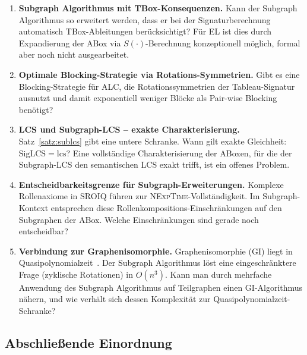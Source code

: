 ﻿\documentclass[a4paper,12pt]{article}
\theoremstyle{definition}
\theoremstyle{plain}
\theoremstyle{remark}
\begin{document}
\begin{enumerate}
  \item \textbf{Subgraph Algorithmus mit TBox-Konsequenzen.}
        Kann der Subgraph Algorithmus so erweitert werden,
        dass er bei der Signaturberechnung automatisch
        TBox-Ableitungen ber{\"u}cksichtigt?
        F{\"u}r \textsf{EL} ist dies durch Expandierung der ABox via
        $S(\cdot)$-Berechnung konzeptionell m{\"o}glich,
        formal aber noch nicht ausgearbeitet.

  \item \textbf{Optimale Blocking-Strategie via Rotations-Symmetrien.}
        Gibt es eine Blocking-Strategie f{\"u}r \textsf{ALC},
        die Rotationssymmetrien der Tableau-Signatur ausnutzt
        und damit exponentiell weniger Bl{\"o}cke als Pair-wise Blocking ben{\"o}tigt?

  \item \textbf{LCS und Subgraph-LCS -- exakte Charakterisierung.}
        Satz~\ref{satz:sublcs} gibt eine untere Schranke.
        Wann gilt exakte Gleichheit: $\mathrm{SigLCS} = \mathrm{lcs}$?
        Eine vollst{\"a}ndige Charakterisierung der ABoxen, f{\"u}r die
        der Subgraph-LCS den semantischen LCS exakt trifft,
        ist ein offenes Problem.

  \item \textbf{Entscheidbarkeitsgrenze f{\"u}r Subgraph-Erweiterungen.}
        Komplexe Rollenaxiome in \textsf{SROIQ} f{\"u}hren zur
        \textsc{NExpTime}-Vollst{\"a}ndigkeit. Im Subgraph-Kontext
        entsprechen diese Rollenkompositions-Einschr{\"a}nkungen auf
        den Subgraphen der ABox. Welche Einschr{\"a}nkungen sind
        gerade noch entscheidbar?

  \item \textbf{Verbindung zur Graphenisomorphie.}
        Graphenisomorphie (GI) liegt in Quasipolynomialzeit~\cite{Babai2016}.
        Der Subgraph Algorithmus l{\"o}st eine eingeschr{\"a}nktere Frage
        (zyklische Rotationen) in $O(n^3)$.
        Kann man durch mehrfache Anwendung des Subgraph Algorithmus
        auf Teilgraphen einen GI-Algorithmus n{\"a}hern,
        und wie verh{\"a}lt sich dessen Komplexit{\"a}t zur Quasi\-polynomialzeit-Schranke?
\end{enumerate}

\subsection{Abschlie{\ss}ende Einordnung}
\end{document}

